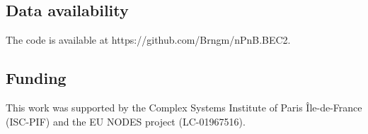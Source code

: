 \documentclass[12pt]{article}
\theoremstyle{thmstyleone}%
\theoremstyle{definition}
\newcommand\reallywidehat[1]{%
\savestack{\tmpbox}{\stretchto{%
  \scaleto{%
    \scalerel*[\widthof{\ensuremath{#1}}]{\kern-.6pt\bigwedge\kern-.6pt}%
    {\rule[-\textheight/2]{1ex}{\textheight}}%
  }{\textheight}%
}{0.8ex}}%
\stackon[1pt]{#1}{\tmpbox}%
}
\begin{document}
%
%
%



\subsection*{Data availability}
The code is available at https://github.com/Brngm/nPnB.BEC2.

\subsection*{Funding}
This work was supported by the Complex Systems Institute of Paris Île-de-France (ISC-PIF) and the EU NODES project (LC-01967516).


\newpage


\end{document}
